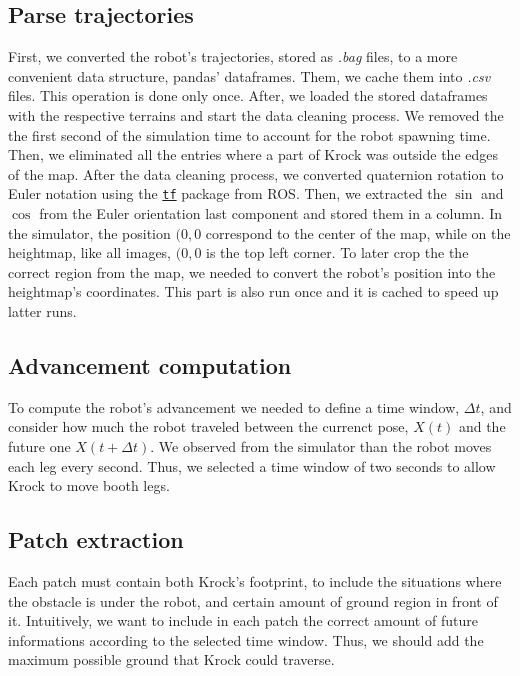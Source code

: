 \documentclass[../document.tex]{subfiles}
\begin{document}
\subsection{Parse trajectories}
First, we converted the robot's trajectories, stored as \emph{.bag} files, to a more convenient data structure, pandas' dataframes. Them, we cache them into \emph{.csv} files. This operation is done only once.
After, we loaded the stored dataframes with the respective terrains and start the data cleaning process. We removed the the first second of the simulation time to account for the robot spawning time. Then, we eliminated all the entries where a part of Krock was outside the edges of the map. After the data cleaning process, we converted quaternion rotation to Euler notation using the \href{https://duckduckgo.com/?q=ros+tf&atb=v154-1__&ia=web}{\texttt{tf}} package from ROS. Then, we extracted the $\sin$ and $\cos$ from the Euler orientation last component and stored them in a column. In the simulator, the position $(0,0$ correspond to the center of the map, while on the heightmap, like all images, $(0,0$ is the top left corner. To later crop the the correct region from the map, we needed to convert the robot's position into the heightmap's coordinates. This part is also run once and it is cached to speed up latter runs.

\subsection{Advancement computation}
To compute the robot's advancement we needed to define a time window, $\Delta t$, and consider how much the robot traveled between the currenct pose, $X(t)$ and the future one $X(t + \Delta t)$. We observed from the simulator than the robot moves each leg every second. Thus, we selected a time window of two seconds to allow Krock to move booth legs. 

\subsection{Patch extraction}
Each patch must contain both Krock's footprint, to include the situations where the obstacle is under the robot, and certain amount of ground region in front of it. Intuitively, we want to include in each patch the correct amount of future informations according to the selected time window. Thus, we should add the maximum possible ground that Krock could traverse. 
\end{document}
